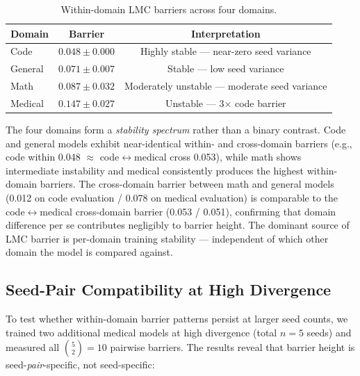 \documentclass[11pt,a4paper]{article}
\begin{document}
\begin{table}[h]
\centering
\caption{Within-domain LMC barriers across four domains.}
\label{tab:within}
\begin{tabular}{@{}lcc@{}}
\toprule
\textbf{Domain} & \textbf{Barrier} & \textbf{Interpretation} \\
\midrule
Code    & $0.048 \pm 0.000$ & Highly stable — near-zero seed variance \\
General & $0.071 \pm 0.007$ & Stable — low seed variance \\
Math    & $0.087 \pm 0.032$ & Moderately unstable — moderate seed variance \\
Medical & $0.147 \pm 0.027$ & Unstable — 3$\times$ code barrier \\
\bottomrule
\end{tabular}
\end{table}

The four domains form a \emph{stability spectrum} rather than a binary contrast. Code and general models exhibit near-identical within- and cross-domain barriers (e.g., code within 0.048 $\approx$ code$\leftrightarrow$medical cross 0.053), while math shows intermediate instability and medical consistently produces the highest within-domain barriers. The cross-domain barrier between math and general models (0.012 on code evaluation / 0.078 on medical evaluation) is comparable to the code$\leftrightarrow$medical cross-domain barrier (0.053 / 0.051), confirming that domain difference per se contributes negligibly to barrier height. The dominant source of LMC barrier is per-domain training stability — independent of which other domain the model is compared against.

\subsection{Seed-Pair Compatibility\label{sec:seedpair} at High Divergence}

To test whether within-domain barrier patterns persist at larger seed counts, we trained two additional medical models at high divergence (total $n = 5$ seeds) and measured all $\binom{5}{2} = 10$ pairwise barriers. The results reveal that barrier height is seed-\emph{pair}-specific, not seed-specific:
\end{document}
